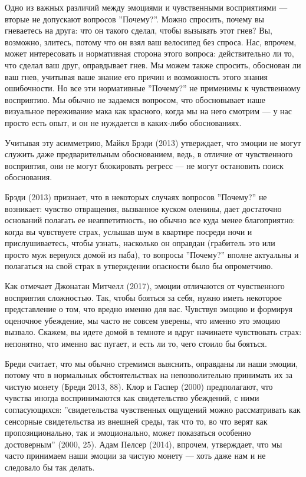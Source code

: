 \documentclass[11pt]{book}
\begin{document}
Одно из важных различий между эмоциями и чувственными восприятиями --- вторые не допускают вопросов ''Почему?''. Можно спросить, почему вы гневаетесь на друга: что он такого сделал, чтобы вызывать этот гнев? Вы, возможно, злитесь, потому что он взял ваш велосипед без спроса. Нас, впрочем, может интересовать и нормативная сторона этого вопроса: действительно ли то, что сделал ваш друг, оправдывает гнев. Мы можем также спросить, обоснован ли ваш гнев, учитывая ваше знание его причин и возможность этого знания ошибочности. Но все эти нормативные ''Почему?'' не применимы к чувственному восприятию. Мы обычно не задаемся вопросом, что обосновывает наше визуальное переживание мака как красного, когда мы на него смотрим --- у нас просто есть опыт, и он не нуждается в каких-либо обоснованиях.

Учитывая эту асимметрию, Майкл Брэди (2013) утверждает, что эмоции не могут служить даже предварительным обоснованием, ведь, в отличие от чувственного восприятия, они не могут блокировать регресс --- не могут остановить поиск обоснования.

Брэди (2013) признает, что в некоторых случаях вопросов ''Почему?'' не возникает: чувство отвращения, вызванное куском оленины, дает достаточно оснований полагать ее неаппетитность, но обычно все куда менее благоприятно: когда вы чувствуете страх, услышав шум в квартире посреди ночи и прислушиваетесь, чтобы узнать, насколько он оправдан (грабитель это или просто муж вернулся домой из паба), то вопросы ''Почему?'' вполне актуальны и полагаться на свой страх в утверждении опасности было бы опрометчиво.

Как отмечает Джонатан Митчелл (2017), эмоции отличаются от чувственного восприятия сложностью. Так, чтобы бояться за себя, нужно иметь некоторое представление о том, что вредно именно для вас. Чувствуя эмоцию и формируя оценочное убеждение, мы часто не совсем уверены, что именно это эмоцию вызвало. Скажем, вы идете домой в темноте и вдруг начинаете чувствовать страх: непонятно, что именно вас пугает, и есть ли то, чего стоило бы бояться.

Бреди считает, что мы обычно стремимся выяснить, оправданы ли наши эмоции, потому что в нормальных обстоятельствах на непозволительно принимать их за чистую монету (Бреди 2013, 88). Клор и Гаспер (2000) предполагают, что чувства иногда воспринимаются как свидетельство убеждений, с ними согласующихся: ''свидетельства чувственных ощущений можно рассматривать как сенсорные свидетельства из внешней среды, так что то, во что верят как пропозиционально, так и эмоционально, может показаться особенно достоверным'' (2000, 25). Адам Пелсер (2014), впрочем, утверждает, что мы часто принимаем наши эмоции за чистую монету --- хоть даже нам и не следовало бы так делать.
\end{document}

